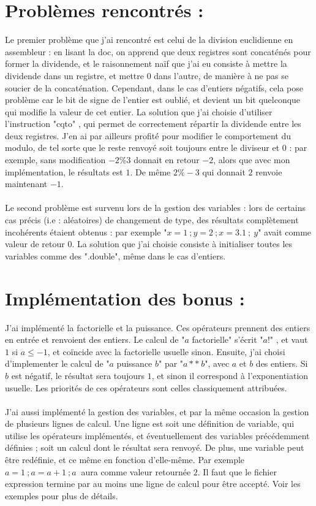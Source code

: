 \documentclass[11pt,a4paper]{article}
\begin{document}
\section{Problèmes rencontrés :}
 Le premier problème que j'ai rencontré est celui de la division euclidienne en assembleur : en lisant la doc, on apprend que deux registres sont concaténés pour former la dividende, et le raisonnement naïf que j'ai eu consiste à mettre la dividende dans un registre, et mettre 0 dans l'autre, de manière à ne pas se soucier de la concaténation. Cependant, dans le cas d'entiers négatifs, cela pose problème car le bit de signe de l'entier est oublié, et devient un bit quelconque qui modifie la valeur de cet entier. La solution que j'ai choisie d'utiliser l'instruction "cqto" , qui permet de correctement répartir la dividende entre les deux registres. J'en ai par ailleurs profité pour modifier le comportement du modulo, de tel sorte que le reste renvoyé soit toujours entre le diviseur et 0 : par exemple, sans modification $ -2 \% 3 $ donnait en retour $-2$, alors que avec mon implémentation, le résultats est $1$. De même $2 \%-3$ qui donnait $2$ renvoie maintenant $-1$. \\ \\
Le second problème est survenu lors de la gestion des variables : lors de certains cas précis (i.e : aléatoires) de changement de type, des résultats complètement incohérents étaient obtenus : par exemple "$x=1 \ ; y=2 \ ; x=3.1 \ ; \ y$" avait comme valeur de retour $0$. La solution que j'ai choisie consiste à initialiser toutes les variables comme des ".double", même dans le cas d'entiers.

\section{Implémentation des bonus :}
J'ai implémenté la factorielle et la puissance. Ces opérateurs prennent des entiers en entrée et renvoient des entiers. Le calcul de "$a$ factorielle" s'écrit "$a!$" , et vaut $1$ si $a \leq -1$, et coïncide avec la factorielle usuelle sinon. Ensuite, j'ai choisi d'implementer le calcul de "$a$ puissance $b$" par "$a** \ b$", avec $a$ et $b$ des entiers. Si $b$ est négatif, le résultat sera toujours $1$, et sinon il correspond à l'exponentiation usuelle. Les priorités de ces opérateurs sont celles classiquement attribuées.\\ \\
J'ai aussi implémenté la gestion des variables, et par la même occasion la gestion de plusieurs lignes de calcul. Une ligne est soit une définition de variable, qui utilise les opérateurs implémentés, et éventuellement des variables précédemment définies ; soit un calcul dont le résultat sera renvoyé. De plus, une variable peut être redéfinie, et ce même en fonction d'elle-même. Par exemple $a=1 \ ; a=a+1 \ ; a \ $ aura comme valeur retournée $2$. Il faut que le fichier expression termine par au moins une ligne de calcul pour être accepté. Voir les exemples pour plus de détails.
\end{document}

